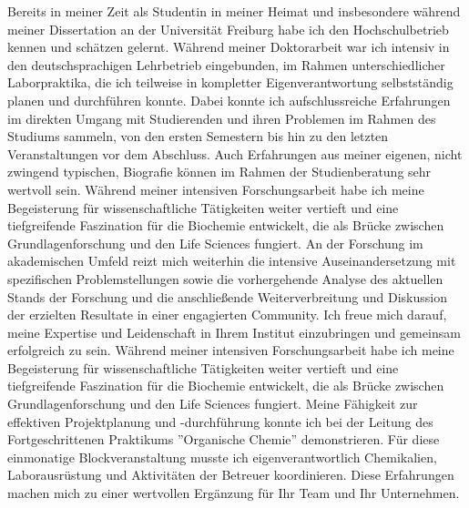     {Bereits in meiner Zeit als Studentin in meiner Heimat und insbesondere während meiner Dissertation an der Universität Freiburg habe ich den Hochschulbetrieb kennen und schätzen gelernt. Während meiner Doktorarbeit war ich intensiv in den deutschsprachigen Lehrbetrieb eingebunden, im Rahmen unterschiedlicher Laborpraktika, die ich teilweise in kompletter Eigenverantwortung selbstständig planen und durchführen konnte. Dabei konnte ich aufschlussreiche Erfahrungen im direkten Umgang mit Studierenden und ihren Problemen im Rahmen des Studiums sammeln, von den ersten Semestern bis hin zu den letzten Veranstaltungen vor dem Abschluss. Auch Erfahrungen aus meiner eigenen, nicht zwingend typischen, Biografie können im Rahmen der Studienberatung sehr wertvoll sein.}{}
    {Während meiner intensiven Forschungsarbeit habe ich meine Begeisterung für wissenschaftliche Tätigkeiten weiter vertieft und eine tiefgreifende Faszination für die Biochemie entwickelt, die als Brücke zwischen Grundlagenforschung und den Life Sciences fungiert. An der Forschung im akademischen Umfeld reizt mich weiterhin die intensive Auseinandersetzung mit spezifischen Problemstellungen sowie die vorhergehende Analyse des aktuellen Stands der Forschung und die anschließende Weiterverbreitung und Diskussion der erzielten Resultate in einer engagierten Community. Ich freue mich darauf, meine Expertise und Leidenschaft in Ihrem Institut einzubringen und gemeinsam erfolgreich zu sein.}{}
    {Während meiner intensiven Forschungsarbeit habe ich meine Begeisterung für wissenschaftliche Tätigkeiten weiter vertieft und eine tiefgreifende Faszination für die Biochemie entwickelt, die als Brücke zwischen Grundlagenforschung und den Life Sciences fungiert. Meine Fähigkeit zur effektiven Projektplanung und -durchführung konnte ich bei der Leitung des Fortgeschrittenen Praktikums ''Organische Chemie'' demonstrieren. Für diese einmonatige Blockveranstaltung musste ich eigenverantwortlich Chemikalien, Laborausrüstung und Aktivitäten der Betreuer koordinieren. Diese Erfahrungen machen mich zu einer wertvollen Ergänzung für Ihr Team und Ihr Unternehmen.}{}
